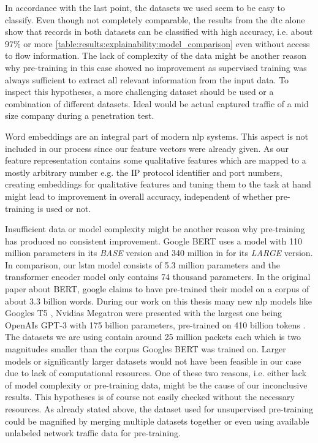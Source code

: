 In accordance with the last point, the datasets we used seem to be easy to classify. Even though not completely comparable, the results from the \gls{dtc} alone show that records in both datasets can be classified with high accuracy, i.e. about 97\% or more \ref{table:results:explainability:model_comparison} even without access to flow information.
The lack of complexity of the data might be another reason why pre-training in this case showed no improvement as supervised training was always sufficient to extract all relevant information from the input data. To inspect this hypotheses, a more challenging dataset should be used or a combination of different datasets. Ideal would be actual captured traffic of a mid size company during a penetration test. \par

Word embeddings are an integral part of modern \gls{nlp} systems. This aspect is not included in our process since our feature vectors were already given. As our feature representation contains some qualitative features which are mapped to a mostly arbitrary number e.g. the IP protocol identifier and port numbers, creating embeddings for qualitative features and tuning them to the task at hand might lead to improvement in overall accuracy, independent of whether pre-training is used or not. \par
	
Insufficient data or model complexity might be another reason why pre-training has produced no consistent improvement. Google BERT \cite{bert} uses a model with 110 million parameters in its \textit{BASE} version and 340 million in for its \textit{LARGE} version. In comparison, our \gls{lstm} model consists of 5.3 million parameters and the transformer encoder model only contains 74 thousand parameters. In the original paper about BERT, google claims to have pre-trained their model on a corpus of about 3.3 billion words. During our work on this thesis many new \gls{nlp} models like Googles T5 \cite{google_t5}, Nvidias Megatron \cite{megatron} were presented with the largest one being OpenAIs GPT-3 with 175 billion parameters, pre-trained on 410 billion tokens \cite{gpt3}. The datasets we are using contain around 25 million packets each which is two magnitudes smaller than the corpus Googles BERT was trained on. Larger models or significantly larger datasets would not have been feasible in our case due to lack of computational resources. One of these two reasons, i.e. either lack of model complexity or pre-training data, might be the cause of our inconclusive results. This hypotheses is of course not easily checked without the necessary resources. As already stated above, the dataset used for unsupervised pre-training could be magnified by merging multiple datasets together or even using available unlabeled network traffic data for pre-training. \par

